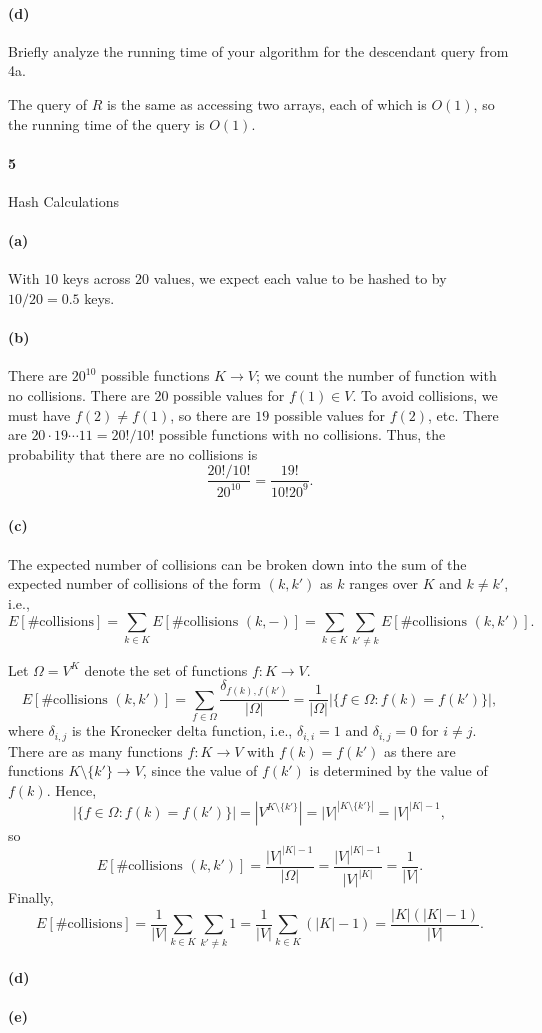 \documentclass[12pt]{article}
\newlength{\myparskip}
\newenvironment{fullbox}{\begin{lrbox}{\savefullbox}\begin{minipage}{\dimexpr\textwidth-2\fboxsep\relax}\setlength{\parskip}{\myparskip}}{\end{minipage}\end{lrbox}\framebox[\textwidth]{\usebox{\savefullbox}}}
\newenvironment{pbox}[1][]{\begin{fullbox}\def\temp{#1}\ifx\temp\empty\else\paragraph{#1}\phantom{}\fi}{\end{fullbox}}
\theoremstyle{definition}
\newcommand{\<}{\langle}
\renewcommand{\>}{\rangle}
\begin{document}
\begin{pbox}[(d)]
    Briefly analyze the running time of your algorithm for the descendant query from 4a.
\end{pbox}

The query of $R$ is the same as accessing two arrays, each of which is $O(1)$, so the running time of the query is $O(1)$.



\newpage
\begin{pbox}[5]
    Hash Calculations
\end{pbox}

\begin{pbox}[(a)]
    
\end{pbox}

With $10$ keys across $20$ values, we expect each value to be hashed to by $10/20 = 0.5$ keys.

\begin{pbox}[(b)]
    
\end{pbox}

There are $20^{10}$ possible functions $K \to V$; we count the number of function with no collisions.
There are $20$ possible values for $f(1) \in V$.
To avoid collisions, we must have $f(2) \ne f(1)$, so there are $19$ possible values for $f(2)$, etc.
There are $20 \cdot 19 \cdots 11 = 20!/10!$ possible functions with no collisions.
Thus, the probability that there are no collisions is
\[
    \frac{20!/10!}{20^{10}} = \frac{19!}{10!20^{9}}.
\]


\begin{pbox}[(c)]
    
\end{pbox}

The expected number of collisions can be broken down into the sum of the expected number of collisions of the form $(k, k')$ as $k$ ranges over $K$ and $k \ne k'$, i.e.,
\[
    E[\#\mathrm{collisions}]
        = \sum_{k \in K} E[\#\text{collisions } (k, -)]
        = \sum_{k \in K} \sum_{k' \ne k} E[\#\text{collisions } (k, k')].
\]

Let $\Omega = V^K$ denote the set of functions $f : K \to V$.
\[
    E[\#\text{collisions } (k, k')]
        = \sum_{f \in \Omega} \frac{\delta_{f(k), f(k')}}{|\Omega|}
        = \frac{1}{|\Omega|} |\{f \in \Omega : f(k) = f(k')\}|,
\]
where $\delta_{i,j}$ is the Kronecker delta function, i.e., $\delta_{i,i} = 1$ and $\delta_{i, j} = 0$ for $i \ne j$.
There are as many functions $f : K \to V$ with $f(k) = f(k')$ as there are functions $K \setminus \{k'\} \to V$, since the value of $f(k')$ is determined by the value of $f(k)$.
Hence,
\[
    |\{f \in \Omega : f(k) = f(k')\}|
        = \left|V^{K \setminus \{k'\}}\right|
        = |V|^{|K \setminus \{k'\}|}
        = |V|^{|K| - 1},
\]
so
\[
    E[\#\text{collisions } (k, k')]
        = \frac{|V|^{|K| - 1}}{|\Omega|}
        = \frac{|V|^{|K| - 1}}{|V|^{|K|}}
        = \frac{1}{|V|}.
\]
Finally,
\[
    E[\#\mathrm{collisions}]
        = \frac{1}{|V|} \sum_{k \in K} \sum_{k' \ne k} 1
        = \frac{1}{|V|} \sum_{k \in K} (|K| - 1)
        = \frac{|K|(|K| - 1)}{|V|}.
\]


\begin{pbox}[(d)]
    
\end{pbox}

\begin{pbox}[(e)]
    
\end{pbox}
\end{document}
